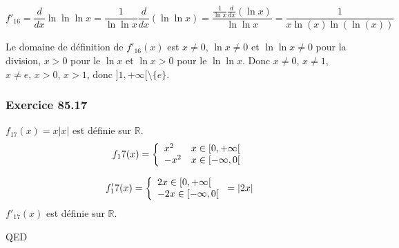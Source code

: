 \documentclass[]{book}
\theoremstyle{definition}
\newcommand{\bb}[1]{\mathbb{#1}}
\newcommand{\R}{\bb{R}}
\begin{document}
$$f'_{16} = \frac{d}{dx}\ln\ln\ln x = \frac{1}{\ln \ln x} \frac{d}{dx}(\ln\ln x) = \frac{\frac{1}{\ln x}\frac{d}{dx}(\ln x)}{\ln \ln x} = \frac{1}{x\ln(x)\ln(\ln(x))} $$

Le domaine de d\'efinition de $f'_{16}(x)$ est $x \neq 0$, $\ln x \neq 0$ et $\ln \ln x \neq 0$ pour la division, $x>0$ pour le $\ln x$ et $\ln x>0$ pour le $\ln \ln x$. Donc $x \neq 0$, $x \neq 1$, $x \neq e$, $x>0$, $x>1$, donc $]1,+\infty[\setminus \{e\}$.


\subsubsection*{Exercice 85.17}
$f_{17}(x) = x|x|$ est d\'efinie sur $\R$.
$$
f_17(x) = 
\left\{ 
\begin{array}{l l}
x^2 & x \in [0,+\infty[ \\
-x^2 & x \in [-\infty,0[ \\
\end{array}
\right. 
$$

$$
f'_17(x) = 
\left\{ 
\begin{array}{l l}
2x \in [0,+\infty[ \\
-2x \in [-\infty,0[ \\
\end{array}
\right. 
=
|2x|
$$
$f'_{17}(x)$ est d\'efinie sur $\R$.



QED
\end{document}
